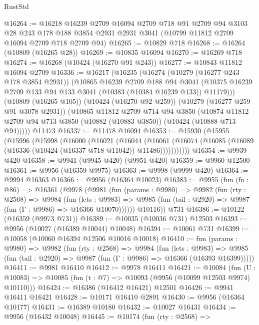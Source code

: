 \begin{lexlean}{RustStd}
\begin{coremodule}
@16264 := @16218
    @16239
    @2709
    @16094
    @2709
    @718
    @91
    @2709
    @94
    @3103
    @28
    @243
    @178
    @188
    @3854
    @2931
    @2931
    @3041
    (@10799 @11812 @2709 @16094 @2709 @718 @2709 @94)
@16265 := @10829 @718
@16268 := @16264 (@10809 (@16265 @28))
@16269 := @10835 @16094
@16270 := @16269 @718
@16274 := @16268 (@10424 (@16270 @91 @243))
@16277 := @10843 @11812 @16094 @2709
@16336 := @16217
    (@16235
      (@16274
        (@10279 (@16277 @243 @178 @3854 @2931))
        (@10865
          @16239
          @2709
          @188
          @94
          @3041
          (@10375 @16239 @2709 @133 @94 @133 @3041 (@10383 (@10384 @16239 @133)) @11179)))
      (@10809 (@16265 @105))
      (@10424 (@16270 @92 @259))
      (@10279 (@16277 @259 @91 @3078 @2931))
      (@10865
        @11812
        @2709
        @714
        @94
        @3850
        (@10874 @11812 @2709 @94 @713 @3850 (@10882 (@10883 @3850)) (@10424 (@10888 @713 @94)))))
    @11473
@16337 := @11478 @16094
@16353 := @15930
    (@15955
      (@15996
        (@15998
          (@16000
            (@16021
              (@16044
                (@16061
                  (@16074 (@16085 (@16089 (@16336 (@10424 (@16337 @718 @11042)) @11486)))))))))))
@16354 := @9939 @420
@16358 := @9941 (@9945 @420) (@9951 @420)
@16359 := @9960 @12500
@16361 := @9956 (@16359 @9975)
@16363 := @9998 (@9999 @420)
@16364 := @9994 @16363
@16366 := @9956 (@16364 @10023)
@16383 := @9955
    (fun (fn : @86) =>
    @16361
      (@9978
        (@9981
          (fun (params : @9980) =>
          @9982
            (fun (rty : @2568) =>
            @9984
              (fun (lets : @9983) =>
              @9985 (fun (tail : @2920) => @9987 (fun (Γ : @9986) => @16366 @10070))))))
        @10116))
    @731
@16386 := @10122 (@16359 (@9973 @731))
@16389 := @10035 (@10036 @731) @12503
@16393 := @9956 (@10027 (@16389 @10044) @10048)
@16394 := @10061 @731
@16399 := @10058 (@10060 @16394 @12506 @10016 @10018)
@16410 := fun (params : @9980) =>
  @9982
    (fun (rty : @2568) =>
    @9984
      (fun (lets : @9983) =>
      @9985 (fun (tail : @2920) => @9987 (fun (Γ : @9986) => @16366 (@16393 @16399)))))
@16411 := @9981 @16410
@16412 := @9978 @16411
@16421 := @10084
    (fun (U : @10083) => @10085 (fun (t : @7) => @10093 (@9956 (@10099 @12503 @9974) @10110)))
@16424 := @16386 (@16412 @16421) @12501
@16426 := @9941 @16411 @16421
@16428 := @10171 @16410 @2891
@16430 := @9956 (@16364 @10177)
@16431 := @16389 @10180
@16432 := @10027 @16431
@16434 := @9956 (@16432 @10048)
@16445 := @10174
    (fun (rty : @2568) =>

\end{coremodule}
\end{lexlean}
